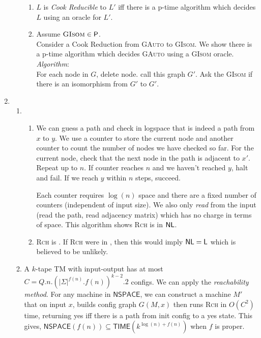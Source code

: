 \documentclass[a4paper, draft, 12pt]{article}
\begin{document}
\begin{enumerate}
\begin{enumerate}
\begin{enumerate}
  \item %
  $L$ is \textit{Cook Reducible} to $L'$ iff there is a p-time algorithm 
  which decides $L$ using an oracle for $L'$. 
  \item %
  Assume $\textsc{GIsom} \in \textsf{P}$. \\
  Consider a Cook Reduction from \textsc{GAuto} to \textsc{GIsom}. 
  We show there is a p-time algorithm which decides \textsc{GAuto} using a \textsc{GIsom} oracle.
  \\\textit{Algorithm}:\\
  For each node in $G$, 
  delete node. call this graph $G'$. Ask the \textsc{GIsom} if there is an isomorphism from $G'$ to $G'$.
  \end{enumerate}
\end{enumerate}
\item %
\begin{enumerate}
\item %
  \begin{enumerate}
  \item %
  We can guess a path and check in logspace that is indeed a path from $x$ to $y$. 
  We use a counter to store the current node and another counter to count the 
  number of nodes we have checked so far. For the current node, check that the next node 
  in the path is adjacent to $x'$. Repeat up to $n$. If counter reaches $n$ and we haven't 
  reached $y$, halt and fail. If we reach $y$ within $n$ steps, succeed. 

  Each counter requires $\log(n)$ space and there are a fixed number of counters 
  (independent of input size). We also only \textit{read} from the input (read the path, 
  read adjacency matrix) which has no charge in terms of space. This algorithm shows \textsc{Rch} is in $\textsf{NL}$. 
  \item %
  \textsc{Rch} is \nlc. If \textsc{Rch} were in \el, then this would imply $\textsf{NL} = \textsf{L}$ which is believed to be unlikely.
  \end{enumerate}
  \item %
  A $k$-tape TM with input-output has at most $C = Q.n.(|\Sigma|^{f(n)}.f(n))^{k-2}.2$ configs. 
  We can apply the \textit{reachability method}. For any machine in $\textsf{NSPACE}$, 
  we can construct a machine $M'$ that on input $x$, builds config graph $G(M,x)$ then 
  runs \textsc{Rch} in $O(C^2)$ time, returning yes iff there is a path from init config to a yes state.
  This gives, $\textsf{NSPACE}(f(n)) \subseteq \textsf{TIME}(k^{\log(n)+f(n)})$ when $f$ is proper.


\end{enumerate}
\end{enumerate}
\end{document}
